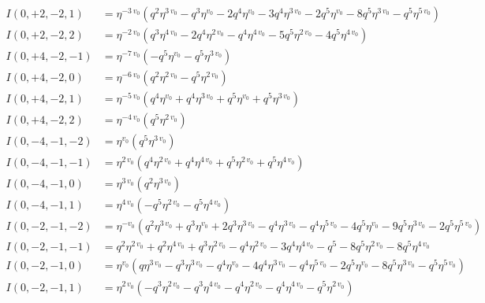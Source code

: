 \documentclass{article}
\begin{document}
\begin{align*}
I(0, +2, -2, 1) &= \eta^{-3 \, v_{0}} \left( q^{2} \eta^{3 \, v_{0}} - q^{3} \eta^{v_{0}} - 2 q^{4} \eta^{v_{0}} - 3 q^{4} \eta^{3 \, v_{0}} - 2 q^{5} \eta^{v_{0}} - 8 q^{5} \eta^{3 \, v_{0}} - q^{5} \eta^{5 \, v_{0}} \right) \\
I(0, +2, -2, 2) &= \eta^{-2 \, v_{0}} \left( q^{3} \eta^{4 \, v_{0}} - 2 q^{4} \eta^{2 \, v_{0}} - q^{4} \eta^{4 \, v_{0}} - 5 q^{5} \eta^{2 \, v_{0}} - 4 q^{5} \eta^{4 \, v_{0}} \right) \\
I(0, +4, -2, -1) &= \eta^{-7 \, v_{0}} \left( -q^{5} \eta^{v_{0}} - q^{5} \eta^{3 \, v_{0}} \right) \\
I(0, +4, -2, 0) &= \eta^{-6 \, v_{0}} \left( q^{2} \eta^{2 \, v_{0}} - q^{5} \eta^{2 \, v_{0}} \right) \\
I(0, +4, -2, 1) &= \eta^{-5 \, v_{0}} \left( q^{4} \eta^{v_{0}} + q^{4} \eta^{3 \, v_{0}} + q^{5} \eta^{v_{0}} + q^{5} \eta^{3 \, v_{0}} \right) \\
I(0, +4, -2, 2) &= \eta^{-4 \, v_{0}} \left( q^{5} \eta^{2 \, v_{0}} \right) \\
I(0, -4, -1, -2) &= \eta^{v_{0}} \left( q^{5} \eta^{3 \, v_{0}} \right) \\
I(0, -4, -1, -1) &= \eta^{2 \, v_{0}} \left( q^{4} \eta^{2 \, v_{0}} + q^{4} \eta^{4 \, v_{0}} + q^{5} \eta^{2 \, v_{0}} + q^{5} \eta^{4 \, v_{0}} \right) \\
I(0, -4, -1, 0) &= \eta^{3 \, v_{0}} \left( q^{2} \eta^{3 \, v_{0}} \right) \\
I(0, -4, -1, 1) &= \eta^{4 \, v_{0}} \left( -q^{5} \eta^{2 \, v_{0}} - q^{5} \eta^{4 \, v_{0}} \right) \\
I(0, -2, -1, -2) &= \eta^{-v_{0}} \left( q^{2} \eta^{3 \, v_{0}} + q^{3} \eta^{v_{0}} + 2 q^{3} \eta^{3 \, v_{0}} - q^{4} \eta^{3 \, v_{0}} - q^{4} \eta^{5 \, v_{0}} - 4 q^{5} \eta^{v_{0}} - 9 q^{5} \eta^{3 \, v_{0}} - 2 q^{5} \eta^{5 \, v_{0}} \right) \\
I(0, -2, -1, -1) &= q^{2} \eta^{2 \, v_{0}} + q^{2} \eta^{4 \, v_{0}} + q^{3} \eta^{2 \, v_{0}} - q^{4} \eta^{2 \, v_{0}} - 3 q^{4} \eta^{4 \, v_{0}} - q^{5} - 8 q^{5} \eta^{2 \, v_{0}} - 8 q^{5} \eta^{4 \, v_{0}} \\
I(0, -2, -1, 0) &= \eta^{v_{0}} \left( q \eta^{3 \, v_{0}} - q^{3} \eta^{3 \, v_{0}} - q^{4} \eta^{v_{0}} - 4 q^{4} \eta^{3 \, v_{0}} - q^{4} \eta^{5 \, v_{0}} - 2 q^{5} \eta^{v_{0}} - 8 q^{5} \eta^{3 \, v_{0}} - q^{5} \eta^{5 \, v_{0}} \right) \\
I(0, -2, -1, 1) &= \eta^{2 \, v_{0}} \left( -q^{3} \eta^{2 \, v_{0}} - q^{3} \eta^{4 \, v_{0}} - q^{4} \eta^{2 \, v_{0}} - q^{4} \eta^{4 \, v_{0}} - q^{5} \eta^{2 \, v_{0}} \right) \\

\end{align*}
\end{document}
